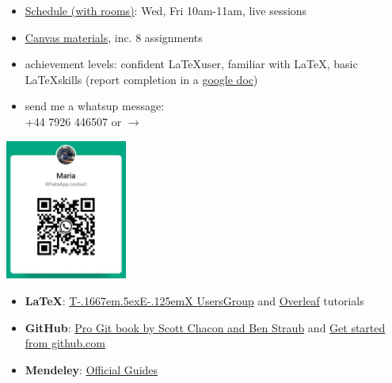 \documentclass[a4paper,12pt]{article} %
\def\TeX{{\rm T\kern-.1667em\lower.5ex\hbox{E}\kern-.125emX }}
\newcommand{\llogo}{\LaTeX }
\begin{document}
\begin{center}

\begin{tcolorbox}[width=\textwidth, colback={yellow!40!white}, title={\textbf{Housekeeping}}, colbacktitle=yellow!60!white, coltitle=black]
	
	\begin{multicols}{2}

		\begin{itemize}
			\item \href{https://wlv.instructure.com/courses/33429/pages/latex-and-mendeley-workshop}{Schedule (with rooms)}: Wed, Fri 10am-11am, live sessions
			\item \href{https://canvas.wlv.ac.uk/courses/31120/files/folder/LaTeX\%20Workshop}{Canvas materials}, inc. 8 assignments 
			\item achievement levels: confident \llogo user, familiar with \LaTeX, basic \llogo skills (report completion in a \href{}{google doc})
			\item send me a whatsup message: \\ +44 7926 446507 or $\rightarrow$
		\end{itemize}
	
	\columnbreak
	\centering
	 \includegraphics[width=40mm]{maria_ku_whatsup_contact}%


\end{multicols}
\end{tcolorbox}%

\bigskip%

	
\maketitle\graphicspath{ {./images/} }
\begin{tcolorbox}[width=\textwidth, colback={white}, title={\textbf{Recommended resources}}, colbacktitle=white, coltitle=black]
	\begin{itemize}
	\item \textbf{LaTeX}: \href{https://tug.org/begin.html}{\TeX UsersGroup} and \href{https://www.overleaf.com/learn/latex/Learn_LaTeX_in_30_minutes}{Overleaf} tutorials
	\item \textbf{GitHub}: \href{https://git-scm.com/book/en/v2}{Pro Git book by Scott Chacon and Ben Straub} and \href{https://docs.github.com/en/get-started}{Get started from github.com}
	\item \textbf{Mendeley}: \href{https://www.mendeley.com/guides}{Official Guides}
	
\end{itemize}
	
\end{tcolorbox}%

\end{center}
\end{document}
